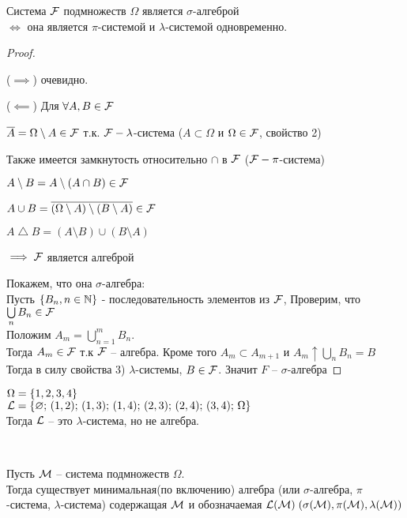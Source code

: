 
\begin{lemma}
	Система $\mathcal{F}$ подмножеств $\Omega$ является $\sigma$-алгеброй \\
	$\iff$ она является $\pi$-системой и $\lambda$-системой одновременно.
	
	\begin{proof}~

		($\implies$) очевидно.

		($\impliedby$) Для $\forall A, B \in \mathcal{F}$

		$\overline{A} = \Omega \setminus A \in \mathcal{F}$ т.к. $\mathcal{F} - \lambda$-система ($A \subset \Omega$ и $\Omega \in \mathcal{F}$, свойство 2)
		
		
		Также имеется замкнутость относительно $\cap$ в $\mathcal{F}$ 
		($\mathcal{F} - \pi$-система) 

		$A \setminus B = A \setminus (A \cap B) \in \mathcal{F}$
		
		$A \cup B = \overline{(\Omega \setminus A) \setminus (B \setminus A)} \in \mathcal{F}$

		$A \bigtriangleup B = (A \setminus B) \cup (B \setminus A)$
		
		$\implies \mathcal{F}$ является алгеброй

		Покажем, что она $\sigma$-алгебра:\\
		Пусть $\left\{  B_n, n \in \mathbb{N}  \right\}$ - последовательность элементов из $\mathcal{F}$, 
		Проверим, что $\bigcup\limits_{n} B_n \in \mathcal{F}$\\
		
		Положим $A_m = \bigcup\limits_{n = 1}^{m} B_n$. \\
		Тогда $A_m \in \mathcal{F}$ т.к $\mathcal{F}$ -- алгебра. Кроме того $A_m \subset A_{m + 1}$ и
		$A_m \uparrow \bigcup\limits_n B_n = B$ \\
		
		Тогда в силу свойства 3) $\lambda$-системы, $B \in \mathcal{F}$. Значит $F$ -- $\sigma$-алгебра
		
	\end{proof}
\end{lemma}

\begin{example}
	$\Omega = \left\{  1, 2, 3, 4  \right\}$\\
	$\mathcal{L} = \left\{  \varnothing;\, (1, 2);\, (1, 3);\, 
	(1, 4);\, (2, 3);\, (2, 4);\, (3, 4);\, \Omega  \right\}$\\
	Тогда $\mathcal{L}$ -- это $\lambda$-система, но не алгебра.
\end{example}

\begin{lemma}~

	Пусть $\mathcal{M}$ -- система подмножеств $\Omega$.\\
	Тогда существует минимальная(по включению) алгебра 
	(или $\sigma$-алгебра, $\pi$-система, $\lambda$-система) содержащая $\mathcal{M}$ и обозначаемая
	$\mathcal{L}(\mathcal{M})\; (\sigma(\mathcal{M}), \pi(\mathcal{M}), \lambda(\mathcal{M}))$
\end{lemma}

